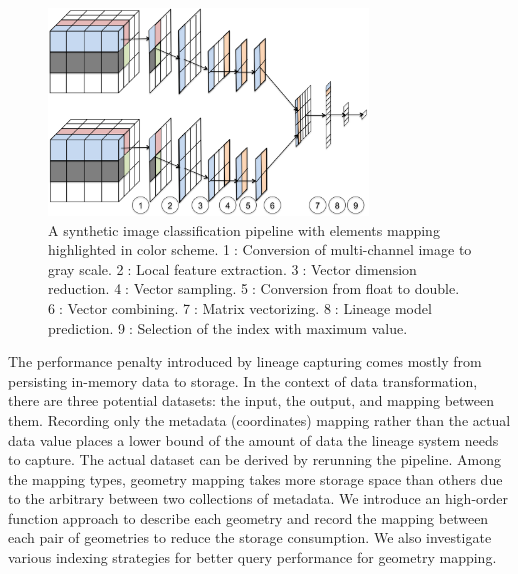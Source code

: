 \documentclass{sig-alternate}
\begin{document}
\begin{figure}[h]
\begin{center}
    \includegraphics[width=85mm]{pictures/Conceptual}
    \caption {A synthetic image classification pipeline with elements mapping highlighted in color scheme. 
    \textcircled{1}: Conversion of multi-channel image to gray scale.
    \textcircled{2}: Local feature extraction.
    \textcircled{3}: Vector dimension reduction.
    \textcircled{4}: Vector sampling.
    \textcircled{5}: Conversion from float to double.
    \textcircled{6}: Vector combining.
    \textcircled{7}: Matrix vectorizing.
    \textcircled{8}: Lineage model prediction.
    \textcircled{9}: Selection of the index with maximum value.
    \label{fig:conceptual}
}
\end{center}
\end{figure}

The performance penalty introduced by lineage capturing comes mostly from persisting in-memory data to storage.
In the context of data transformation, there are three potential datasets: the input, the output, and mapping between them.
Recording only the metadata (coordinates) mapping rather than the actual data value places a lower bound of the amount
of data the lineage system needs to capture. The actual dataset can be derived by rerunning the pipeline.
Among the mapping types, geometry mapping takes more storage space than others due to the arbitrary between two collections
of metadata. We introduce an high-order function approach to describe each geometry and record the mapping between
each pair of geometries to reduce the storage consumption. We also investigate various indexing strategies for better
query performance for geometry mapping.
\end{document}
